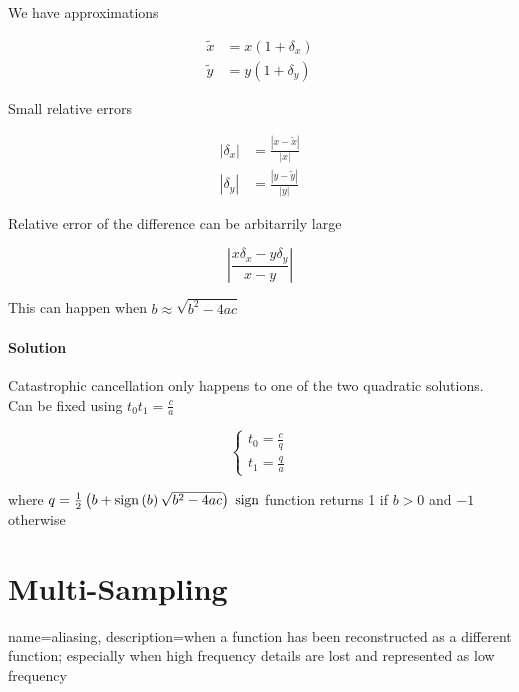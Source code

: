       We have approximations

      \begin{align}
        \tilde{x} &= x \left( 1 + \delta_{x} \right) \\
        \tilde{y} &= y \left( 1 + \delta_{y} \right)
      \end{align}

      Small relative errors

      \begin{align}
        \left| \delta_{x} \right| &= \frac{\left| x - \tilde{x} \right|}{\left| x \right|} \\
        \left| \delta_{y} \right| &= \frac{\left| y - \tilde{y} \right|}{\left| y \right|}
      \end{align}

      Relative error of the difference can be arbitarrily large

      \begin{equation}
        \left| \frac{x \delta_{x} - y \delta_{y}}{x - y} \right|
      \end{equation}

      This can happen when $ b \approx \sqrt{b^{2} - 4ac} $

      \paragraph{Solution} Catastrophic cancellation only happens to one of the
      two quadratic solutions. Can be fixed using $ t_{0} t_{1} = \frac{c}{a} $

      \begin{equation}
        \begin{cases}
          t_{0} = \frac{c}{q} \\
          t_{1} = \frac{q}{a}
        \end{cases}
      \end{equation}

      where $ q = \frac{1}{2}\left( b + \operatorname{sign}\left( b \right) \sqrt{b^{2} - 4ac} \right) $
      $ \operatorname{sign} $ function returns 1 if $ b > 0 $ and $ - 1 $ otherwise
\section{Multi-Sampling}

  {
    name=aliasing,
    description={when a function has been reconstructed as a
    different function; especially when high frequency details are lost and
    represented as low frequency}
  }

